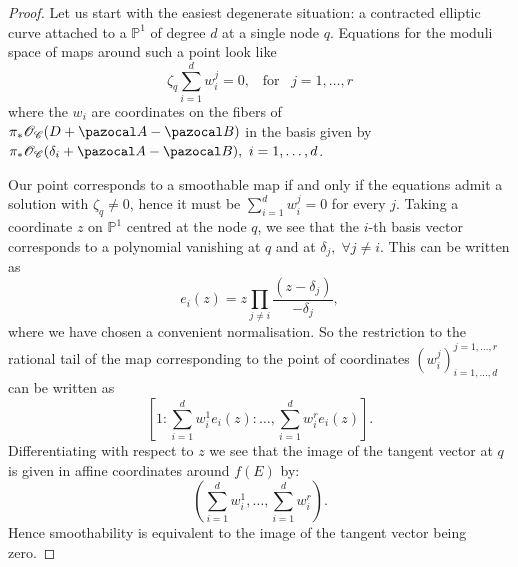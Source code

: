 \documentclass[11pt]{amsart}
\newcommand{\PP}{\mathbb P}
\renewcommand{\to}{\rightarrow}
\newcommand{\A}{\pazocal A}
\newcommand{\B}{\pazocal B}
\newcommand{\cC}{\mathcal C}
\theoremstyle{plain}
\newtheorem{prop}[thm]{Proposition}
\theoremstyle{definition}
\begin{document}

\begin{proof}
 Let us start with the easiest degenerate situation: a contracted elliptic curve attached to a $\PP^1$ of degree $d$ at a single node $q$. Equations for the moduli space of maps around such a point look like 
 \[\zeta_q\sum_{i=1}^d w_i^j=0,\;\;\;\text{for} \;\;\;j=1,\ldots,r\]
 where the $w_i$ are coordinates on the fibers of $\pi_*\mathcal O_{\cC}(D+\A-\B)$ in the basis given by $\pi_*\mathcal O_{\cC}(\delta_i+\A-\B),\ i=1,\ldots,d$.
 
  Our point corresponds to a smoothable map if and only if the equations admit a solution with $\zeta_q\neq 0$, hence it must be $\sum_{i=1}^d w_i^j=0$ for every $j$. Taking a coordinate $z$ on  $\PP^1$ centred at the node $q$, we see that the $i$-th basis vector corresponds to a polynomial vanishing at $q$ and at $\delta_j,\;\forall j\neq i$. This can be written as 
  \[e_i(z)=z\prod_{j\neq i}\frac{(z-\delta_j)}{-\delta_j},\] 
  where we have chosen a convenient normalisation. So the restriction to the rational tail of the map corresponding to the point of coordinates $(w_i^j)_{i=1,\ldots,d}^{j=1,\ldots,r}$ can be written as 
  \[[1:\sum_{i=1}^d w_i^1e_i(z):\ldots,\sum_{i=1}^d w_i^re_i(z)].\] 
  Differentiating with respect to $z$ we see that the image of the tangent vector at $q$ is given in affine coordinates around $f(E)$ by:
  \[(\sum_{i=1}^d w_i^1,\ldots,\sum_{i=1}^d w_i^r).\] 
  Hence smoothability is equivalent to the image of the tangent vector being zero.
 

\end{proof}
\end{document}
